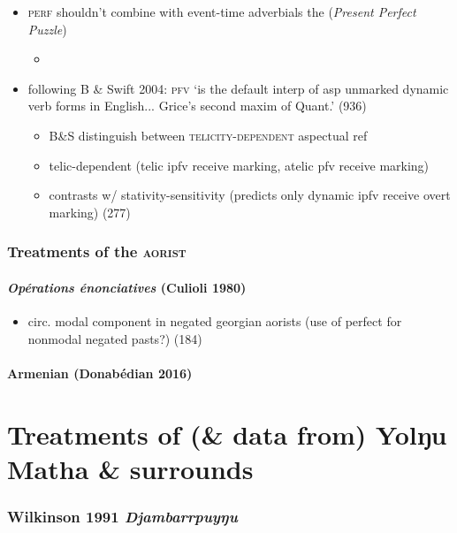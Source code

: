 \documentclass[10pt]{article}
\begin{document}
\begin{itemize}
\begin{itemize}
\end{itemize}
\item \textsc{perf} shouldn't combine with event-time adverbials the (\textit{Present Perfect Puzzle})
\begin{itemize}
	\item 
\end{itemize}
\item following B \& Swift 2004: \textsc{pfv} `is the default interp of asp unmarked dynamic verb forms	in English... Grice's second maxim of Quant.' (936)
\begin{itemize}
	\item B\&S distinguish between \textsc{telicity-dependent} aspectual ref
	\item telic-dependent (telic ipfv receive marking, atelic pfv receive marking)
	\item contrasts w/ stativity-sensitivity (predicts only dynamic ipfv receive overt marking) (277)
\end{itemize}
\end{itemize}

\section{Treatments of the \textsc{aorist}}
\subsection{\textit{Opérations énonciatives} (Culioli 1980)}

\begin{itemize}
	\item circ. modal component in negated georgian aorists (use of perfect for nonmodal negated pasts?) (184)
\end{itemize}
\subsection{Armenian (Donabédian 2016)}


\part{Treatments of (\& data from) Yolŋu Matha \& surrounds}
	\section{Wilkinson 1991 \textit{Djambarrpuyŋu}}
	{\large {}}
\end{document}
